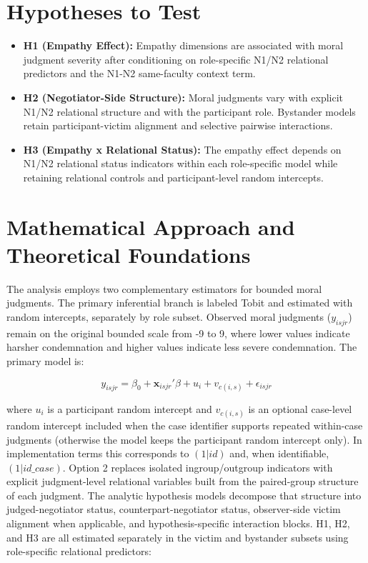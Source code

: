 \documentclass[11pt]{article}
\begin{document}
\section{Hypotheses to Test}
\begin{itemize}
  \item \textbf{H1 (Empathy Effect):} Empathy dimensions are associated with moral judgment severity after conditioning on role-specific N1/N2 relational predictors and the N1-N2 same-faculty context term.
  \item \textbf{H2 (Negotiator-Side Structure):} Moral judgments vary with explicit N1/N2 relational structure and with the participant role. Bystander models retain participant-victim alignment and selective pairwise interactions.
  \item \textbf{H3 (Empathy x Relational Status):} The empathy effect depends on N1/N2 relational status indicators within each role-specific model while retaining relational controls and participant-level random intercepts.
\end{itemize}

\section{Mathematical Approach and Theoretical Foundations}
The analysis employs two complementary estimators for bounded moral judgments. The primary inferential branch is labeled Tobit and estimated with random intercepts, separately by role subset. 
Observed moral judgments ($y_{isjr}$) remain on the original bounded scale from -9 to 9, where lower values indicate harsher condemnation and higher values indicate less severe condemnation. 
The primary model is:

$$y_{isjr} = \beta_0 + \mathbf{x}_{isjr}'\beta + u_i + v_{c(i,s)} + \epsilon_{isjr}$$

where $u_i$ is a participant random intercept and $v_{c(i,s)}$ is an optional case-level random intercept included when the case identifier supports repeated within-case judgments (otherwise the model keeps the participant random intercept only). In implementation terms this corresponds to $(1|id)$ and, when identifiable, $(1|id\_case)$.
Option 2 replaces isolated ingroup/outgroup indicators with explicit judgment-level relational variables built from the paired-group structure of each judgment. The analytic hypothesis models decompose that structure into judged-negotiator status, counterpart-negotiator status, observer-side victim alignment when applicable, and hypothesis-specific interaction blocks.
 H1, H2, and H3 are all estimated separately in the victim and bystander subsets using role-specific relational predictors:
\end{document}
